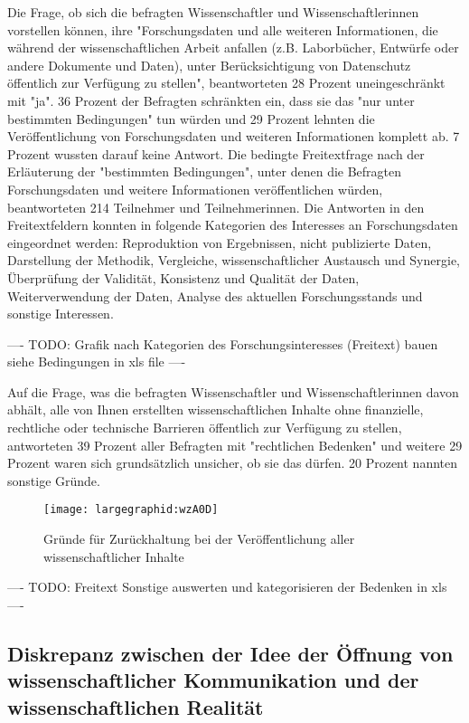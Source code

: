 Die Frage, ob sich die befragten Wissenschaftler und Wissenschaftlerinnen vorstellen können, ihre "Forschungsdaten und alle weiteren Informationen, die während der wissenschaftlichen Arbeit anfallen (z.B. Laborbücher, Entwürfe oder andere Dokumente und Daten), unter Berücksichtigung von Datenschutz öffentlich zur Verfügung zu stellen", beantworteten 28 Prozent uneingeschränkt mit "ja". 36 Prozent der Befragten schränkten ein, dass sie das "nur unter bestimmten Bedingungen" tun würden und 29 Prozent lehnten die Veröffentlichung von Forschungsdaten und weiteren Informationen komplett ab. 7 Prozent wussten darauf keine Antwort. Die bedingte Freitextfrage nach der Erläuterung der "bestimmten Bedingungen", unter denen die Befragten Forschungsdaten und weitere Informationen veröffentlichen würden, beantworteten 214 Teilnehmer und Teilnehmerinnen. Die Antworten in den Freitextfeldern konnten in folgende Kategorien des Interesses an Forschungsdaten eingeordnet werden: Reproduktion von Ergebnissen, nicht publizierte Daten, Darstellung der Methodik, Vergleiche, wissenschaftlicher Austausch und Synergie, Überprüfung der Validität, Konsistenz und Qualität der Daten, Weiterverwendung der Daten, Analyse des aktuellen Forschungsstands und sonstige Interessen.

---- TODO: Grafik nach Kategorien des Forschungsinteresses (Freitext) bauen siehe Bedingungen in xls file ----

Auf die Frage, was die befragten Wissenschaftler und Wissenschaftlerinnen davon abhält, alle von Ihnen erstellten wissenschaftlichen Inhalte ohne finanzielle, rechtliche oder technische Barrieren öffentlich zur Verfügung zu stellen, antworteten 39 Prozent aller Befragten mit "rechtlichen Bedenken" und weitere 29 Prozent waren sich grundsätzlich unsicher, ob sie das dürfen. 20 Prozent nannten sonstige Gründe.

\begin{figure}[h!]
\texttt{[image: largegraphid:wzA0D]}
\caption{Gründe für Zurückhaltung bei der Veröffentlichung aller wissenschaftlicher Inhalte}
\end{figure}

---- TODO: Freitext Sonstige auswerten und kategorisieren der Bedenken in xls ----

\subsection{Diskrepanz zwischen der Idee der Öffnung von wissenschaftlicher Kommunikation und der wissenschaftlichen Realität}

